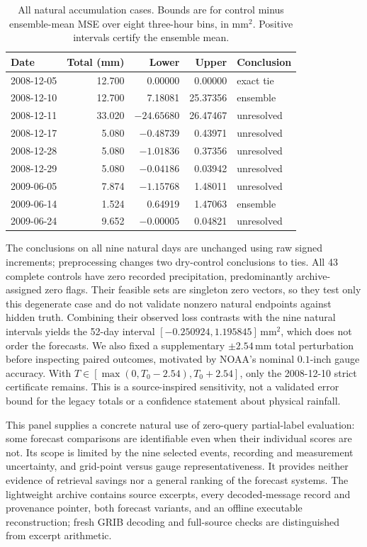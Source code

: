 \documentclass[12pt]{article}
\begin{document}
\begin{table}[t]
\centering
\caption{All natural accumulation cases. Bounds are for control minus
ensemble-mean MSE over eight three-hour bins, in $\mathrm{mm}^2$.
Positive intervals certify the ensemble mean.}
\label{tab:noaa-natural}
\begin{tabular}{lrrrl}
\hline
Date & Total (mm) & Lower & Upper & Conclusion\\
\hline
2008-12-05 & 12.700 & 0.00000 & 0.00000 & exact tie\\
2008-12-10 & 12.700 & 7.18081 & 25.37356 & ensemble\\
2008-12-11 & 33.020 & $-24.65680$ & 26.47467 & unresolved\\
2008-12-17 & 5.080 & $-0.48739$ & 0.43971 & unresolved\\
2008-12-28 & 5.080 & $-1.01836$ & 0.37356 & unresolved\\
2008-12-29 & 5.080 & $-0.04186$ & 0.03942 & unresolved\\
2009-06-05 & 7.874 & $-1.15768$ & 1.48011 & unresolved\\
2009-06-14 & 1.524 & 0.64919 & 1.47063 & ensemble\\
2009-06-24 & 9.652 & $-0.00005$ & 0.04821 & unresolved\\
\hline
\end{tabular}
\end{table}

The conclusions on all nine natural days are unchanged using raw signed
increments; preprocessing changes two dry-control conclusions to ties.
All 43 complete controls have zero recorded precipitation, predominantly
archive-assigned zero flags. Their feasible sets are singleton zero vectors,
so they test only this degenerate case and do not validate nonzero natural
endpoints against hidden truth. Combining their observed loss contrasts with
the nine natural intervals yields the 52-day interval
$[-0.250924,1.195845]\,\mathrm{mm}^2$, which does not order the forecasts.
We also fixed a supplementary $\pm2.54$\,mm total perturbation before inspecting
paired outcomes, motivated by NOAA's nominal $0.1$-inch gauge accuracy.
With $T\in[\max(0,T_0-2.54),T_0+2.54]$, only the 2008-12-10 strict certificate
remains. This is a source-inspired sensitivity, not a validated error bound
for the legacy totals or a confidence statement about physical rainfall.

This panel supplies a concrete natural use of zero-query partial-label
evaluation: some forecast comparisons are identifiable even when their
individual scores are not. Its scope is limited by the nine selected events,
recording and measurement uncertainty, and grid-point versus gauge
representativeness. It provides neither evidence of retrieval savings nor
a general ranking of the forecast systems. The lightweight archive contains
source excerpts, every decoded-message record and provenance pointer, both
forecast variants, and an offline executable reconstruction; fresh GRIB
decoding and full-source checks are distinguished from excerpt arithmetic.
\end{document}
